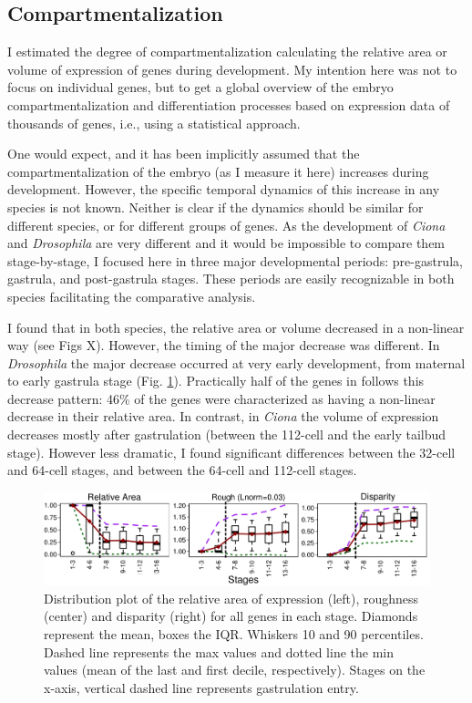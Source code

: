 \subsection{Compartmentalization}
I estimated the degree of compartmentalization calculating the relative area or volume of expression of genes during development.
My intention here was not to focus on individual genes, but to get a global overview of the embryo compartmentalization and differentiation processes based on expression data of thousands of genes, i.e., using a statistical approach.

One would expect, and it has been implicitly assumed \citep{Carroll2001} \citep{Davidson2001} that the compartmentalization of the embryo (as I measure it here) increases during development.
However, the specific temporal dynamics of this increase in any species is not known. Neither is clear if the dynamics should be similar for different species, or for different groups of genes.
As the development of \textit{Ciona} and \textit{Drosophila} are very different and it would be impossible to compare them stage-by-stage, I focused here in three major developmental periods: pre-gastrula, gastrula, and post-gastrula stages. These periods are easily recognizable in both species facilitating the comparative analysis.

I found that in both species, the relative area or volume decreased in a non-linear way (see Figs X). 
However, the timing of the major decrease was different.
In \textit{Drosophila} the major decrease occurred at very early development, from maternal to early gastrula stage (Fig. \ref{fig:Art-I-3measures}).
Practically half of the genes in follows this decrease pattern: 46\% of the genes were characterized as having a non-linear decrease in their relative area.
In contrast, in \textit{Ciona} the volume of expression decreases mostly after gastrulation (between the 112-cell and the early tailbud stage).
However less dramatic, I found significant differences between the 32-cell and 64-cell stages, and between the 64-cell and 112-cell stages.

\begin{figure}[h]
  \includegraphics[width=\textwidth]{./Images/Art-I/3_measures.png}
  \centering
  \caption{Distribution plot of the relative area of expression (left), roughness (center) and disparity (right) for all genes in each stage. Diamonds represent the mean, boxes the IQR. Whiskers 10 and 90 percentiles. Dashed line represents the max values and dotted line the min values (mean of the last and first decile, respectively). Stages on the x-axis, vertical dashed line represents gastrulation entry.}
  \label{fig:Art-I-3measures}
\end{figure}

